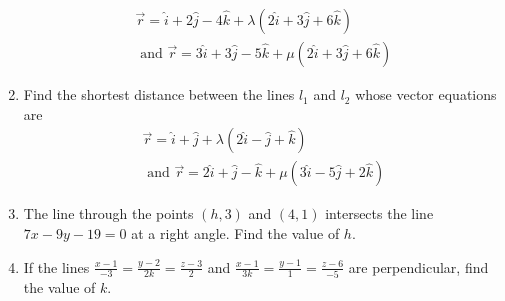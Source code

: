 \begin{enumerate}[label=\thesubsection.\arabic*,ref=\thesubsection.\theenumi]
\begin{align}
\overrightarrow{r}= \hat{i}+ 2 \hat{j}- 4 \hat{k}+ \lambda(2 \hat{i}+ 3 \hat{j}+ 6 \hat{k}) \\
\text{ and }\overrightarrow{r}= 3 \hat{i}+ 3 \hat{j}- 5 \hat{k}+ \mu(2 \hat{i}+ 3 \hat{j}+ 6 \hat{k}) 
\end{align}
\item Find the shortest distance between the lines $l_1$ and $l_2$ whose vector equations are
\begin{align}
\overrightarrow{r}= \hat{i}+ \hat{j}+ \lambda(2 \hat{i}- \hat{j}+ \hat{k}) \\
\text{ and } \overrightarrow{r}= 2 \hat{i}+ \hat{j}- \hat{k}+ \mu(3 \hat{i}- 5 \hat{j}+ 2 \hat{k}) 
\end{align}
\item The line through the points $(h,  3)$ and $(4,  1)$ intersects the line $7x- 9y- 19= 0$ at a right angle. Find the value of $h$.
\label{chapters/11/10/3/10}
\\
\solution

	\item If the lines $\frac{x-1}{-3} = \frac{y-2}{2k} = \frac{z-3}{2}$ and  $\frac{x-1}{3k} = \frac{y-1}{1} = \frac{z-6}{-5}$ are perpendicular,  find the value of $k$.\\
    \solution
		
\end{enumerate}
